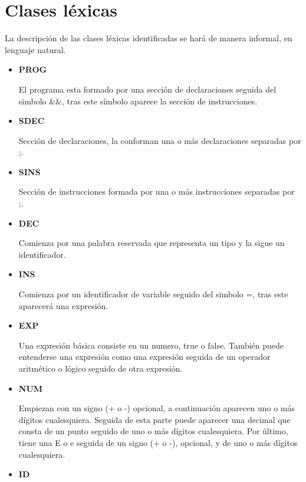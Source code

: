 \documentclass[\main/MemoriaPL.tex]{subfiles}
\begin{document}
  \section{Clases léxicas}
    \par \noindent
    La descripción de las clases léxicas identificadas se hará de manera informal, en lenguaje natural.

    \begin{itemize}
      \item \textbf{PROG}
            \par \noindent
            El programa esta formado por una sección de declaraciones seguida del simbolo \&\&, tras este símbolo aparece
            la sección de instrucciones.
      \item \textbf{SDEC}
            \par \noindent
            Sección de declaraciones, la conforman una o más declaraciones separadas por ;.
      \item \textbf{SINS}
            \par \noindent
            Sección de instrucciones formada por una o más instrucciones separadas por ;.
      \item \textbf{DEC}
            \par \noindent
            Comienza por una palabra reservada que representa un tipo y la sigue un identificador.
      \item \textbf{INS}
            \par \noindent
            Comienza por un identificador de variable seguido del simbolo =, tras este aparecerá una expresión.
      \item \textbf{EXP}
            \par \noindent
            Una expresión básica consiste en un numero, true o false. También puede entenderse una expresión como 
            una expresión seguida de un operador aritmético o lógico seguido de otra expresión.
      \item \textbf{NUM}
            \par \noindent
            Empiezan con un signo (+ o -) opcional, a continuación aparecen uno o más dígitos cualesquiera.
            Seguida de esta parte puede aparecer una decimal que consta de un punto seguido de uno o más dígitos cualesquiera.
            Por último, tiene una E o e seguida de un signo (+ o -), opcional, y de uno o más dígitos cualesquiera.
      \item \textbf{ID}
            \par \noindent

\end{itemize}
\end{document}
